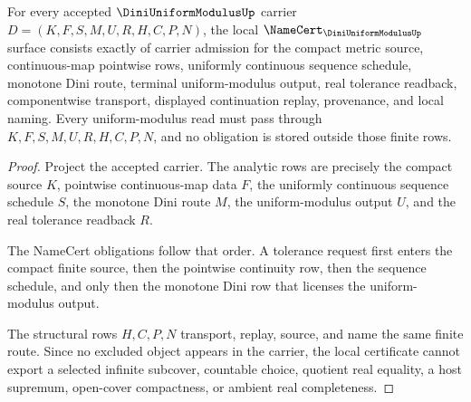 \begin{theorem}
\label{thm:dini-uniform-modulus-namecert-obligations}
For every accepted $\DiniUniformModulusUp$ carrier $D=(K,F,S,M,U,R,H,C,P,N)$, the local $\NameCert_{\DiniUniformModulusUp}$ surface consists exactly of carrier admission for the compact metric source, continuous-map pointwise rows, uniformly continuous sequence schedule, monotone Dini route, terminal uniform-modulus output, real tolerance readback, componentwise transport, displayed continuation replay, provenance, and local naming. Every uniform-modulus read must pass through $K,F,S,M,U,R,H,C,P,N$, and no obligation is stored outside those finite rows.
\end{theorem}
\begin{proof}
Project the accepted carrier. The analytic rows are precisely the compact source $K$, pointwise continuous-map data $F$, the uniformly continuous sequence schedule $S$, the monotone Dini route $M$, the uniform-modulus output $U$, and the real tolerance readback $R$.

The NameCert obligations follow that order. A tolerance request first enters the compact finite source, then the pointwise continuity row, then the sequence schedule, and only then the monotone Dini row that licenses the uniform-modulus output.

The structural rows $H,C,P,N$ transport, replay, source, and name the same finite route. Since no excluded object appears in the carrier, the local certificate cannot export a selected infinite subcover, countable choice, quotient real equality, a host supremum, open-cover compactness, or ambient real completeness.
\end{proof}

